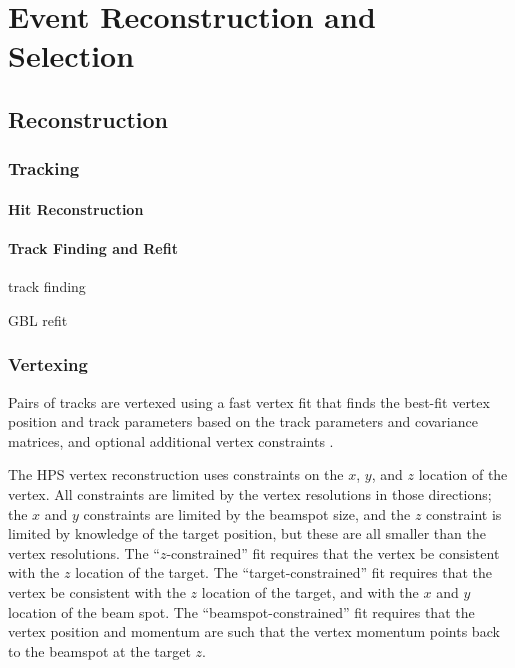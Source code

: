 \chapter{Event Reconstruction and Selection}
\section{Reconstruction}
\subsection{Tracking}
\label{sec:track_recon}

\subsubsection{Hit Reconstruction}
\label{sec:svt_hit_recon}

\subsubsection{Track Finding and Refit}
\label{sec:track_finding_refit}
track finding

GBL refit

\subsection{Vertexing}
\label{sec:vertex_recon}
Pairs of tracks are vertexed using a fast vertex fit that finds the best-fit vertex position and track parameters based on the track parameters and covariance matrices, and optional additional vertex constraints \cite{billoir_fast_1992}.

The HPS vertex reconstruction uses constraints on the $x$, $y$, and $z$ location of the vertex.
All constraints are limited by the vertex resolutions in those directions; the $x$ and $y$ constraints are limited by the beamspot size, and the $z$ constraint is limited by knowledge of the target position, but these are all smaller than the vertex resolutions.
The ``$z$-constrained'' fit requires that the vertex be consistent with the $z$ location of the target.
The ``target-constrained'' fit requires that the vertex be consistent with the $z$ location of the target, and with the $x$ and $y$ location of the beam spot.
The ``beamspot-constrained'' fit requires that the vertex position and momentum are such that the vertex momentum points back to the beamspot at the target $z$.

